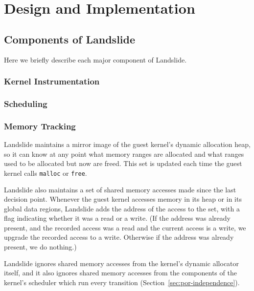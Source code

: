 \section{Design and Implementation}
\subsection{Components of Landslide}

Here we briefly describe each major component of Landslide. %

\subsubsection{Kernel Instrumentation}
\label{sec:components-kern}

\subsubsection{Scheduling}
\label{sec:components-sched}


\subsubsection{Memory Tracking}
\label{sec:components-memory}

Landslide maintains a mirror image of the guest kernel's dynamic allocation heap, so it can know at any point what memory ranges are allocated and what ranges used to be allocated but now are freed. This set is updated each time the guest kernel calls \texttt{malloc} or \texttt{free}.

Landslide also maintains a set of shared memory accesses made since the last decision point. Whenever the guest kernel accesses memory in its heap or in its global data regions, Landslide adds the address of the access to the set, with a flag indicating whether it was a read or a write. (If the address was already present, and the recorded access was a read and the current access is a write, we upgrade the recorded access to a write. Otherwise if the address was already present, we do nothing.)

Landslide ignores shared memory accesses from the kernel's dynamic allocator itself, and it also ignores shared memory accesses from the components of the kernel's scheduler which run every transition (Section~\ref{sec:por-independence}).

